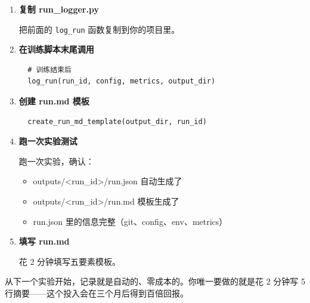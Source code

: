 \begin{enumerate}
  \item \textbf{复制 run\_logger.py}

  把前面的 \texttt{log\_run} 函数复制到你的项目里。

  \item \textbf{在训练脚本末尾调用}
  \begin{verbatim}
  # 训练结束后
  log_run(run_id, config, metrics, output_dir)
  \end{verbatim}

  \item \textbf{创建 run.md 模板}
  \begin{verbatim}
  create_run_md_template(output_dir, run_id)
  \end{verbatim}

  \item \textbf{跑一次实验测试}

  跑一次实验，确认：
  \begin{itemize}
    \item outputs/<run\_id>/run.json 自动生成了
    \item outputs/<run\_id>/run.md 模板生成了
    \item run.json 里的信息完整（git、config、env、metrics）
  \end{itemize}

  \item \textbf{填写 run.md}

  花 2 分钟填写五要素模板。
\end{enumerate}

从下一个实验开始，记录就是自动的、零成本的。你唯一要做的就是花 2 分钟写 5 行摘要——这个投入会在三个月后得到百倍回报。
